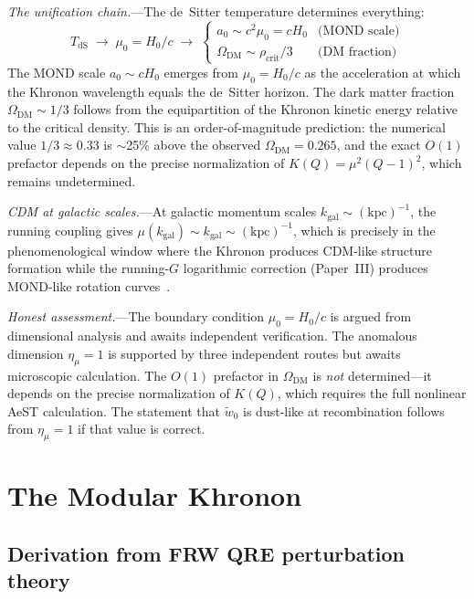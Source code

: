 \documentclass[prd,twocolumn,superscriptaddress,longbibliography,floatfix]{revtex4-2}
\newcommand{\OmDM}{\Omega_{\mathrm{DM}}}
\begin{document}
\emph{The unification chain.}---The de~Sitter
temperature determines everything:
\begin{equation}
T_{\mathrm{dS}} \;\longrightarrow\; \mu_0 = H_0/c
\;\longrightarrow\;
\begin{cases}
a_0 \sim c^2\mu_0 = cH_0 & \text{(MOND scale)}\\
\OmDM \sim \rho_{\mathrm{crit}}/3 & \text{(DM fraction)}
\end{cases}
\label{eq:unification_chain}
\end{equation}
The MOND scale $a_0 \sim cH_0$ emerges from
$\mu_0 = H_0/c$ as the acceleration at which the
Khronon wavelength equals the de~Sitter horizon.
The dark matter fraction $\OmDM \sim 1/3$ follows from
the equipartition of the Khronon kinetic energy
relative to the critical density.  This is an
order-of-magnitude prediction: the numerical
value $1/3 \approx 0.33$ is $\sim$25\% above the
observed $\OmDM = 0.265$, and the exact $O(1)$
prefactor depends on the precise normalization of
$K(Q) = \mu^2(Q-1)^2$, which remains undetermined.

\emph{CDM at galactic scales.}---At galactic momentum
scales $k_{\mathrm{gal}} \sim (\mathrm{kpc})^{-1}$,
the running coupling gives
$\mu(k_{\mathrm{gal}}) \sim k_{\mathrm{gal}}
\sim (\mathrm{kpc})^{-1}$,
which is precisely in the phenomenological window
where the Khronon produces CDM-like structure formation
while the running-$G$ logarithmic correction
(Paper~III) produces MOND-like rotation
curves~\cite{BlanchetSkordis2024,SkordisZlosnik2021}.

\emph{Honest assessment.}---The boundary condition
$\mu_0 = H_0/c$ is argued from dimensional analysis
and awaits independent verification.  The anomalous
dimension $\eta_\mu = 1$ is supported by three
independent routes but awaits microscopic calculation.
The $O(1)$ prefactor in $\OmDM$ is \emph{not}
determined---it depends on the precise normalization of
$K(Q)$, which requires the full nonlinear AeST
calculation.  The statement that $\tilde{w}_0$ is
dust-like at recombination follows from $\eta_\mu = 1$
if that value is correct.


\section{The Modular Khronon}
\label{sec:khronon}

\subsection{Derivation from FRW QRE perturbation theory}
\end{document}
